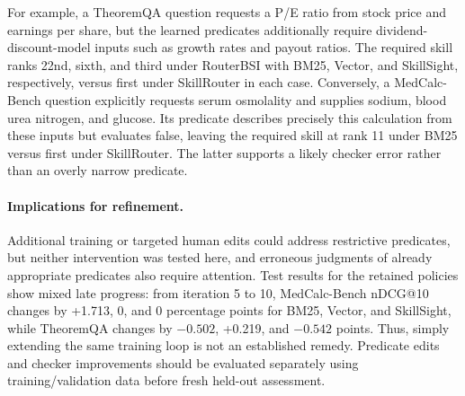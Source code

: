For example, a TheoremQA question requests a P/E ratio from stock price and earnings per share, but the learned predicates additionally require dividend-discount-model inputs such as growth rates and payout ratios. The required skill ranks 22nd, sixth, and third under RouterBSI with BM25, Vector, and SkillSight, respectively, versus first under SkillRouter in each case. Conversely, a MedCalc-Bench question explicitly requests serum osmolality and supplies sodium, blood urea nitrogen, and glucose. Its predicate describes precisely this calculation from these inputs but evaluates false, leaving the required skill at rank 11 under BM25 versus first under SkillRouter. The latter supports a likely checker error rather than an overly narrow predicate.

\paragraph{Implications for refinement.}
Additional training or targeted human edits could address restrictive predicates, but neither intervention was tested here, and erroneous judgments of already appropriate predicates also require attention. Test results for the retained policies show mixed late progress: from iteration 5 to 10, MedCalc-Bench nDCG@10 changes by +1.713, 0, and 0 percentage points for BM25, Vector, and SkillSight, while TheoremQA changes by $-0.502$, +0.219, and $-0.542$ points. Thus, simply extending the same training loop is not an established remedy. Predicate edits and checker improvements should be evaluated separately using training/validation data before fresh held-out assessment.
